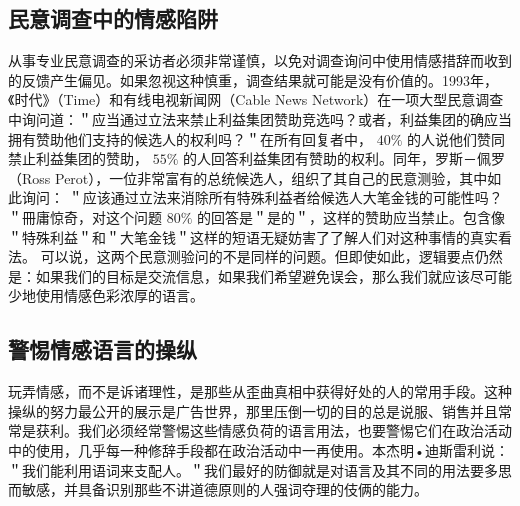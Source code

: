 \subsection{民意调查中的情感陷阱}

从事专业民意调查的采访者必须非常谨慎，以免对调查询问中使用情感措辞而收到的反馈产生偏见。如果忽视这种慎重，调查结果就可能是没有价值的。1993年，《时代》（Time）和有线电视新闻网（Cable News Network）在一项大型民意调查中询问道：＂应当通过立法来禁止利益集团赞助竞选吗？或者，利益集团的确应当拥有赞助他们支持的候选人的权利吗？＂在所有回复者中， $40 \%$ 的人说他们赞同禁止利益集团的赞助， $55 \%$ 的人回答利益集团有赞助的权利。同年，罗斯－佩罗（Ross Perot），一位非常富有的总统候选人，组织了其自己的民意测验，其中如此询问： ＂应该通过立法来消除所有特殊利益者给候选人大笔金钱的可能性吗？＂冊庸惊奇，对这个问题 $80 \%$ 的回答是＂是的＂，这样的赞助应当禁止。包含像＂特殊利益＂和＂大笔金钱＂这样的短语无疑妨害了了解人们对这种事情的真实看法。\cite{perot1993}\cite{timecnn1993} 可以说，这两个民意测验问的不是同样的问题。但即使如此，逻辑要点仍然是：如果我们的目标是交流信息，如果我们希望避免误会，那么我们就应该尽可能少地使用情感色彩浓厚的语言。

\subsection{警惕情感语言的操纵}

玩弄情感，而不是诉诸理性，是那些从歪曲真相中获得好处的人的常用手段。这种操纵的努力最公开的展示是广告世界，那里压倒一切的目的总是说服、销售并且常常是获利。我们必须经常警惕这些情感负荷的语言用法，也要警惕它们在政治活动中的使用，几乎每一种修辞手段都在政治活动中一再使用。本杰明•迪斯雷利说：＂我们能利用语词来支配人。＂我们最好的防御就是对语言及其不同的用法要多思而敏感，并具备识别那些不讲道德原则的人强词夺理的伎俩的能力。

